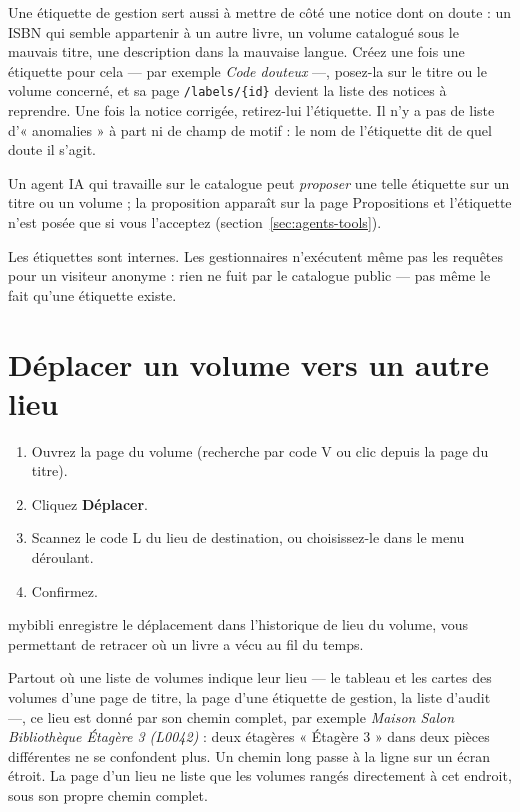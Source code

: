 Une étiquette de gestion sert aussi à mettre de côté une notice dont
on doute : un ISBN qui semble appartenir à un autre livre, un volume
catalogué sous le mauvais titre, une description dans la mauvaise
langue. Créez une fois une étiquette pour cela --- par exemple
\emph{Code douteux} ---, posez-la sur le titre ou le volume concerné, et
sa page \texttt{/labels/\{id\}} devient la liste des notices à
reprendre. Une fois la notice corrigée, retirez-lui l'étiquette. Il n'y
a pas de liste d'« anomalies » à part ni de champ de motif : le nom de
l'étiquette dit de quel doute il s'agit.

Un agent IA qui travaille sur le catalogue peut \emph{proposer} une
telle étiquette sur un titre ou un volume ; la proposition apparaît
sur la page Propositions et l'étiquette n'est posée que si vous
l'acceptez (section~\ref{sec:agents-tools}).

\begin{note}
Les étiquettes sont internes. Les gestionnaires n'exécutent même pas les
requêtes pour un visiteur anonyme : rien ne fuit par le catalogue
public --- pas même le fait qu'une étiquette existe.
\end{note}

\section{Déplacer un volume vers un autre lieu}\label{sec:move-volume}

\begin{enumerate}
  \item Ouvrez la page du volume (recherche par code V ou clic
        depuis la page du titre).
  \item Cliquez \textbf{Déplacer}.
  \item Scannez le code L du lieu de destination, ou choisissez-le
        dans le menu déroulant.
  \item Confirmez.
\end{enumerate}

mybibli enregistre le déplacement dans l'historique de lieu du
volume, vous permettant de retracer où un livre a vécu au fil du
temps.

Partout où une liste de volumes indique leur lieu --- le tableau et les
cartes des volumes d'une page de titre, la page d'une étiquette de
gestion, la liste d'audit ---, ce lieu est donné par son chemin
complet, par exemple \emph{Maison \textrightarrow{} Salon
\textrightarrow{} Bibliothèque \textrightarrow{} Étagère 3 (L0042)} :
deux étagères « Étagère 3 » dans deux pièces différentes ne se
confondent plus. Un chemin long passe à la ligne sur un écran étroit.
La page d'un lieu ne liste que les volumes rangés directement à cet
endroit, sous son propre chemin complet.

